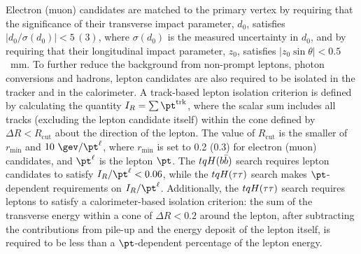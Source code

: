 Electron (muon) candidates are matched to the primary vertex by requiring that the significance of their transverse impact parameter, $d_0$, 
satisfies $|d_0/\sigma(d_0)|<5\,(3)$, where $\sigma(d_0)$ is the measured uncertainty in $d_0$,
and by requiring that their longitudinal impact parameter, $z_0$, satisfies $|z_0 \sin\theta|<0.5$~mm.
To further reduce the background from non-prompt leptons, photon conversions and hadrons, lepton candidates are also required to be isolated 
in the tracker and in the calorimeter.
A track-based lepton isolation criterion is defined by calculating the quantity $I_R = \sum \pt^{\textrm{trk}}$, where
the scalar sum includes all tracks (excluding the lepton candidate itself) within the cone defined by $\Delta R<R_{\textrm{cut}}$ about the %
direction of the lepton.  The value of $R_{\textrm{cut}}$ is the smaller of $r_{\textrm{min}}$ and $10~\gev/\pt^\ell$, where
$r_{\textrm{min}}$ is set to 0.2 (0.3) for electron (muon) candidates, and $\pt^\ell$ is the lepton $\pt$. 
The $tqH(b\bar{b})$ search requires lepton candidates to satisfy $I_R/\pt^\ell < 0.06$, while the $tqH(\tau\tau)$ search 
makes $\pt$-dependent requirements on $I_R/\pt^\ell$. Additionally, the $tqH(\tau\tau)$ search requires leptons to
satisfy a calorimeter-based isolation criterion: the sum of the transverse energy within a cone of
$\Delta R<0.2$ around the lepton, after subtracting the contributions
from pile-up and the energy deposit of the lepton itself, is required to be less than a $\pt$-dependent 
percentage of the lepton energy. 



